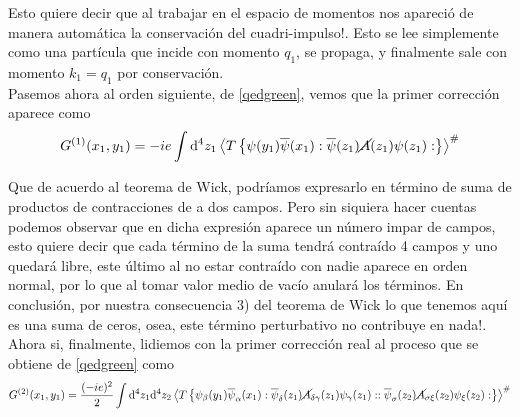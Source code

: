 \documentclass[tickz]{article}
\numberwithin{equation}{section}
\begin{document}
Esto quiere decir que al trabajar en el espacio de momentos nos apareció de
manera automática la conservación del cuadri-impulso!. Esto se lee
simplemente como una partícula que incide con momento $q_{1}$,
se propaga, y finalmente sale con momento $ k_1=q_1 $ por conservación.\\

Pasemos ahora al orden siguiente,
de \ref{qedgreen}, vemos que la primer corrección aparece como
\begin{equation}
G^{(1)}(x_{1},y_{1})=-ie\int \mathrm{d^4}z_{1}\left\langle T\left\{ \psi(y_{1})\overline{\psi}(x_{1}):\overline{\psi}(z_{1})\cancel{A}(z_{1})\psi(z_{1}):\right\} \right\rangle ^{\#}
\end{equation}

Que de acuerdo al teorema de Wick, podríamos expresarlo en término
de suma de productos de contracciones de a dos campos. Pero sin siquiera
hacer cuentas podemos observar que en dicha expresión aparece un número
impar de campos, esto quiere decir que cada término de la suma tendrá
contraído 4 campos y uno quedará libre, este último al no estar contraído
con nadie aparece en orden normal, por lo que al tomar valor medio
de vacío anulará los términos. En conclusión, por nuestra consecuencia
3) del teorema de Wick lo que tenemos aquí es una suma de ceros, osea,
este término perturbativo no contribuye en nada!.\\

Ahora si, finalmente,
lidiemos con la primer corrección real al proceso que se obtiene de \ref{qedgreen} como
\begin{equation}\label{g2}
G^{(2)}(x_{1},y_{1})=\frac{(-ie)^{2}}{2}\int \mathrm{d^4}z_{1}\mathrm{d^4}z_{2}\left\langle T\left\{ \psi_{\beta}(y_{1})\overline{\psi}_{\alpha}(x_{1}):\overline{\psi}_{\delta}(z_{1})\cancel{A}_{\delta\gamma}(z_{1})\psi_{\gamma}(z_{1})::\overline{\psi}_{\sigma}(z_{2})\cancel{A}_{\sigma\xi}(z_{2})\psi_{\xi}(z_{2}):\right\} \right\rangle ^{\#}
\end{equation}
\end{document}
